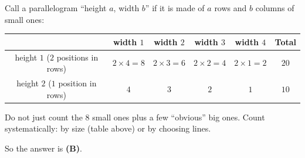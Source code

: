 {
Call a parallelogram ``height $a$, width $b$'' if it is made of $a$ rows and $b$ columns of small ones:
\begin{center}\begin{tabular}{|c|c|c|c|c|c|}\hline
 & width $1$ & width $2$ & width $3$ & width $4$ & Total\\\hline
height $1$ ($2$ positions in rows) & $2\times4=8$ & $2\times3=6$ & $2\times2=4$ & $2\times1=2$ & $20$\\\hline
height $2$ ($1$ position in rows) & $4$ & $3$ & $2$ & $1$ & $10$\\\hline
\end{tabular}\end{center}
\begin{warnbox}Do not just count the $8$ small ones plus a few ``obvious'' big ones. Count systematically: by size (table above) or by
choosing lines.\end{warnbox}
So the answer is \textbf{(B)}.
}

